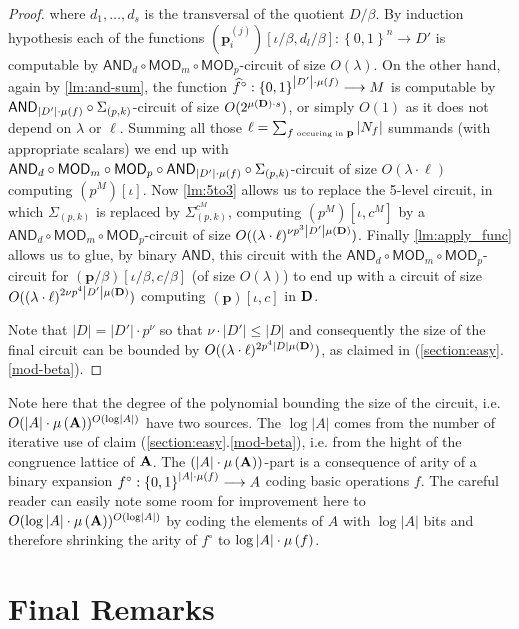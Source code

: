 \documentclass[11pt,a4paper]{amsart}
\newcommand{\m}[1]{{\uppercase {\bf{#1}}}}
\newcommand{\set}[1]{{\left\{ {#1} \right\} }}
\newcommand{\card}[1]{\left| #1 \right|}
\renewcommand{\leq}{\leqslant}
\newcommand{\po}[1]{{\mathbf {#1}}}
\newcounter{note}
\newcounter{claim}
\newcommand{\map}{\longrightarrow}
\newcommand{\h}[1]{\widehat{#1}}
\newcommand{\prog}[2]{\left(#1\right)\!\left[#2\right]}
\newcommand{\progb}[3]{\left(#1\right)\!\left[#2,#3\right]}
\newcommand{\fcirc}[1]{#1^\circ}
\newcommand{\true}{1}
\newcommand{\false}{0}
\newcommand{\bool}{\set{\false,\true}}
\newcommand{\sumpk}[2]{\Sigma_{(#1,#2)}}
\newcommand{\ccc}{c}    \newcommand{\s}{s}
\newcommand{\csize}{\lambda}
\newcommand{\ccand}{\mathsf{AND}}
\newcommand{\ccmod}{\mathsf{MOD}}
\begin{document}
\begin{proof}
\noindent where $d_1,\ldots,d_s$ is the transversal of the quotient $D/\beta$.
By induction hypothesis each of the functions
$\progb{\po p_i^{(j)}}{\iota/\beta}{d_l/\beta}:\bool^n\map D'$
is computable by $\ccand_d\circ\ccmod_{m}\circ\ccmod_p$-circuit
of size $O(\csize)$.
On the other hand, again by \cref{lm:and-sum},
the function $\fcirc{\h{f}}:\bool^{\card{D'}\cdot\ar{f}}\map M$ is computable by
$\ccand_{\card{D'}\cdot\ar{f}}\circ\sumpk{p}{k}$-circuit of size $O(2^{\maxar{D}\cdot s})$,
or simply $O(1)$ as it does not depend on $\csize$ or $\ell$.
Summing all those $\ell=\sum_{f \mbox{\tiny \ occuring in\ } \po p} \card{N_f}$
summands (with appropriate scalars) we end up
with $\ccand_d\circ\ccmod_{m}\circ\ccmod_p
\circ\ccand_{\card{D'}\cdot\ar{f}}\circ\sumpk{p}{k}$-circuit of size $O(\csize\cdot\ell)$
computing $\prog{p^M}{\iota}$.
Now \cref{lm:5to3} allows us to replace the 5-level circuit,
in which $\sumpk{p}{k}$ is replaced by $\sumpk{p}{k}^{c^M}$,
computing $\progb{p^M}{\iota}{c^M}$ by a
$\ccand_d\circ\ccmod_{m}\circ\ccmod_p$-circuit
of size $O((\csize\cdot\ell)^{\nu p^3\card{D'}\maxar{D}})$.
Finally \cref{lm:apply_func} allows us to glue, by binary $\ccand$,
this circuit with the $\ccand_d\circ\ccmod_{m}\circ\ccmod_p$-circuit
for $\progb{\po p/\beta}{\iota/\beta}{\ccc/\beta}$
(of size $O(\csize)$) to end up with a circuit
of size $O((\csize\cdot\ell)^{2\nu p^4\card{D'}\maxar{D}})$
computing $\progb{\po p}{\iota}{\ccc}$ in $\m D$.

Note that $\card{D}=\card{D'}\cdot p^\nu$ so that $\nu\cdot\card{D'}\leq\card{D}$
and consequently the size of the final circuit can be bounded by
$O((\csize\cdot\ell)^{2p^4\card{D}\maxar{D}})$,
as claimed in (\ref{section:easy}.\ref{mod-beta}).
\end{proof}


Note here that the degree of the polynomial bounding the size of the circuit,
i.e.  $O(\card{A}\cdot\maxar{A})^{O(\log\card{A})}$ have two sources.
The $\log\card{A}$ comes from the number of iterative use of claim (\ref{section:easy}.\ref{mod-beta}), i.e. from the hight of the congruence lattice of $\m A$.
The $(\card{A}\cdot\maxar{A})$-part is a consequence of arity of a binary expansion
$\fcirc{f} : \bool^{\card{A}\cdot\ar{f}} \map A$ coding basic operations $f$.
The careful reader can easily note some room for improvement here to
$O(\log\card{A}\cdot\maxar{A})^{O(\log\card{A})}$ by coding the elements of $A$ with $\log\card{A}$ bits and therefore shrinking the arity of $\fcirc{f}$ to $\log\card{A}\cdot\ar{f}$.
\section{Final Remarks}
\end{document}
